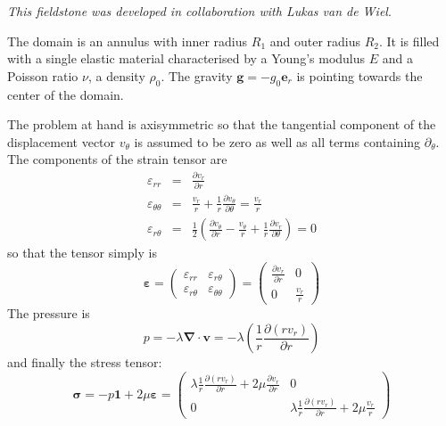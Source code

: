 {\sl This fieldstone was developed in collaboration with Lukas van de Wiel}.

The domain is an annulus with inner radius $R_1$ and outer radius $R_2$. It is filled with a 
single elastic material characterised by a Young's modulus $E$ and a Poisson ratio $\nu$, a
density $\rho_0$. The gravity ${\bm g}=-g_0 {\bm e}_r$ is pointing towards the center of the domain.

The problem at hand is axisymmetric so that the tangential component of the displacement
vector $v_\theta$ is assumed to be zero as well as all terms containing $\partial_\theta$.
The components of the strain tensor are 
\begin{eqnarray}
\varepsilon_{rr} &=& \frac{\partial v_r}{\partial r} \\
\varepsilon_{\theta\theta} &=& \frac{v_r}{r} + \frac{1}{r} \frac{\partial v_\theta}{\partial \theta}
= \frac{v_r}{r} 
 \\
\varepsilon_{r\theta} &=& \frac{1}{2} \left(   \frac{\partial v_\theta}{\partial r} - \frac{v_\theta}{r} 
+\frac{1}{r} \frac{\partial v_r}{\partial \theta}  \right) =0
\end{eqnarray}
so that the tensor simply is
\begin{equation}
{\bm \varepsilon} =
\left(
\begin{array}{cc}
\varepsilon_{rr} & \varepsilon_{r\theta} \\ 
\varepsilon_{r\theta} & \varepsilon_{\theta\theta} 
\end{array}
\right)
=
\left(
\begin{array}{cc}
\frac{\partial v_r}{\partial r} & 0 \\
0 &  \frac{v_r}{r} 
\end{array}
\right)
\end{equation}
The pressure is
\begin{equation}
p=-\lambda {\bm \nabla}\cdot {\bm v}
= -\lambda \left( \frac{1}{r} \frac{\partial (r v_r)}{\partial r} \right)
\end{equation}
and finally the stress tensor:
\begin{equation}
{\bm \sigma} 
= - p {\bm 1} + 2\mu {\bm \varepsilon}
=  
\left(
\begin{array}{cc}
\lambda \frac{1}{r} \frac{\partial (r v_r)}{\partial r} + 2\mu\frac{\partial v_r}{\partial r} & 0 \\
0 & \lambda \frac{1}{r} \frac{\partial (r v_r)}{\partial r}  +  2 \mu\frac{v_r}{r} 
\end{array}
\right)
\end{equation}
